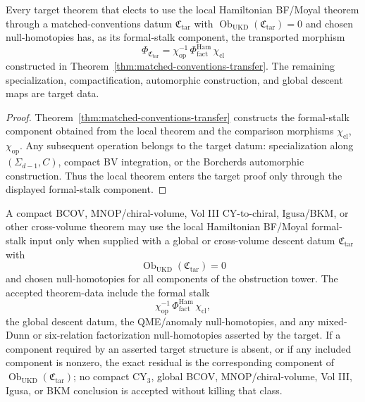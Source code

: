 \begin{cor}\label{cor:matched-conventions-factorization}
  Every target theorem that elects to use the local Hamiltonian BF/Moyal
  theorem through a matched-conventions datum \(\mathfrak C_{\mathrm{tar}}\)
  with \(\operatorname{Ob}_{\mathrm{UKD}}(\mathfrak C_{\mathrm{tar}})=0\) and
  chosen null-homotopies has, as its formal-stalk component, the transported
  morphism
  \[
    \Phi_{\mathfrak C_{\mathrm{tar}}}=
    \chi_{\mathrm{op}}^{-1}\,
    \Phi^{\mathrm{Ham}}_{\mathrm{fact}}\,
    \chi_{\mathrm{cl}}
  \]
  constructed in Theorem~\ref{thm:matched-conventions-transfer}.  The remaining
  specialization, compactification, automorphic construction, and global
  descent maps are target data.
\end{cor}

\begin{proof}
  Theorem~\ref{thm:matched-conventions-transfer} constructs the formal-stalk
  component obtained from the local theorem and the comparison morphisms
  \(\chi_{\mathrm{cl}}\), \(\chi_{\mathrm{op}}\).  Any subsequent operation
  belongs to the target datum: specialization along \((\Sigma_{d-1},C)\),
  compact BV integration, or the Borcherds automorphic construction.  Thus the
  local theorem enters the target proof only through the displayed
  formal-stalk component.
\end{proof}

\begin{cor}\label{cor:target-obstruction-criterion}
  A compact BCOV, MNOP/chiral-volume, Vol III CY-to-chiral, Igusa/BKM, or
  other cross-volume theorem may use the local Hamiltonian BF/Moyal
  formal-stalk input only when supplied with a global or cross-volume
  descent datum
  \(\mathfrak C_{\mathrm{tar}}\) with
  \[
    \operatorname{Ob}_{\mathrm{UKD}}(\mathfrak C_{\mathrm{tar}})=0
  \]
  and chosen null-homotopies for all components of the obstruction tower.
  The accepted theorem-data include the formal stalk
  \[
    \chi_{\mathrm{op}}^{-1}\,
    \Phi^{\mathrm{Ham}}_{\mathrm{fact}}\,
    \chi_{\mathrm{cl}},
  \]
  the global descent datum, the QME/anomaly null-homotopies, and any
  mixed-Dunn or six-relation factorization null-homotopies asserted by
  the target.  If a component required by an asserted target structure is
  absent, or if any included component is nonzero, the exact residual is
  the corresponding component of
  \(\operatorname{Ob}_{\mathrm{UKD}}(\mathfrak C_{\mathrm{tar}})\);
  no compact CY\(_3\), global BCOV, MNOP/chiral-volume, Vol III, Igusa,
  or BKM conclusion is accepted without killing that class.
\end{cor}

